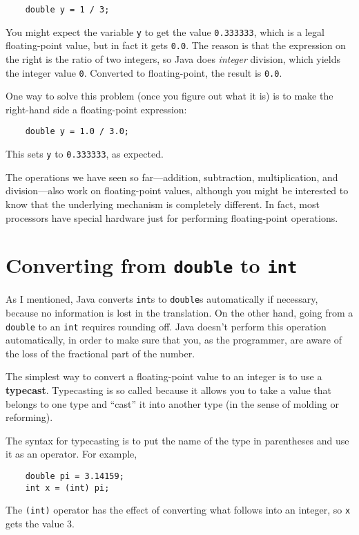 \documentclass[12pt]{book}
\theoremstyle{definition}
\begin{document}
\begin{lstlisting}
    double y = 1 / 3;
\end{lstlisting}
%
You might expect the variable {\tt y} to get the value
{\tt 0.333333}, which is a legal floating-point value, but in
fact it gets {\tt 0.0}.  The reason is that the
expression on the right is the ratio of two integers,
so Java does {\em integer} division, which yields the integer
value {\tt 0}.  Converted to floating-point, the result is
{\tt 0.0}.

One way to solve this problem (once you figure out what
it is) is to make the right-hand side a floating-point
expression:

\begin{lstlisting}
    double y = 1.0 / 3.0;
\end{lstlisting}
%
This sets {\tt y} to {\tt 0.333333}, as expected.


The operations we have seen so far---addition, subtraction,
multiplication, and division---also work on floating-point values,
although you might be interested to know that the underlying mechanism
is completely different.  In fact, most processors have special
hardware just for performing floating-point operations.


\section{Converting from {\tt double} to {\tt int}}
\label{rounding}

As I mentioned, Java converts {\tt int}s
to {\tt double}s automatically if necessary, because no
information is lost in the translation.  On the other hand,
going from a {\tt double} to an {\tt int} requires rounding
off.  Java doesn't perform this operation automatically, in
order to make sure that you, as the programmer, are aware
of the loss of the fractional part of the number.

The simplest way to convert a floating-point value to an integer is to
use a {\bf typecast}.  Typecasting is so called because it allows you
to take a value that belongs to one type and ``cast'' it into another
type (in the sense of molding or reforming).

The syntax for typecasting is to put
the name of the type in parentheses and use it as an operator.
For example,

\begin{lstlisting}
    double pi = 3.14159;
    int x = (int) pi;
\end{lstlisting}
%
The {\tt(int)} operator has the effect of converting what
follows into an integer, so {\tt x} gets the value 3.
\end{document}
